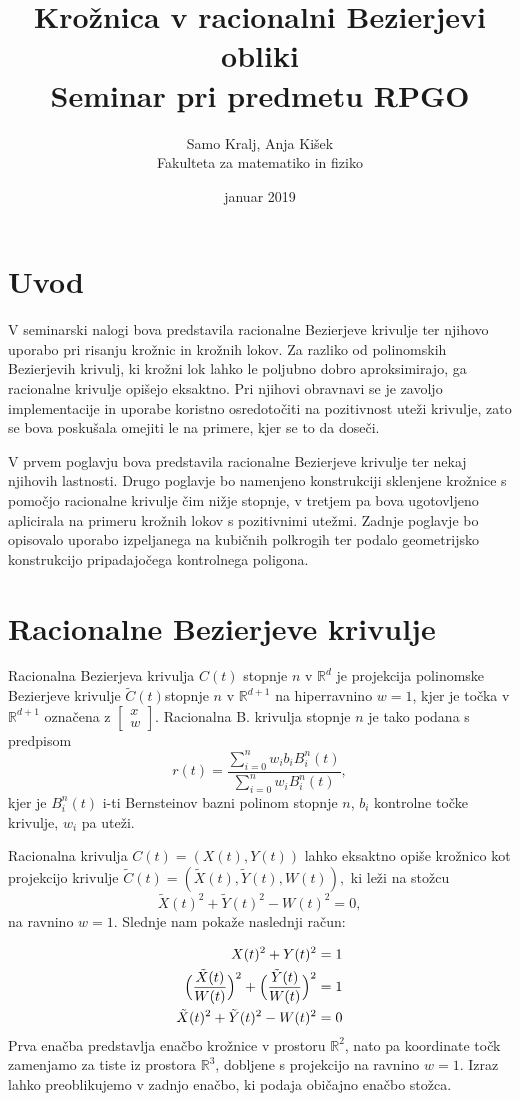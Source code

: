 \documentclass[a4paper,12pt]{article}
\title{Krožnica v racionalni Bezierjevi obliki \\ 
\Large Seminar pri predmetu RPGO}
\author{Samo Kralj, Anja Kišek \\
Fakulteta za matematiko in fiziko}
\date{januar 2019}
\begin{document}
\maketitle
\section{Uvod}
V seminarski nalogi bova predstavila racionalne Bezierjeve krivulje ter njihovo uporabo pri risanju krožnic in krožnih lokov. Za razliko od polinomskih Bezierjevih krivulj, ki krožni lok lahko le poljubno dobro aproksimirajo, ga racionalne krivulje opišejo eksaktno. Pri njihovi obravnavi se je zavoljo implementacije in uporabe koristno osredotočiti na pozitivnost uteži krivulje, zato se bova poskušala omejiti le na primere, kjer se to da doseči.

V prvem poglavju bova predstavila racionalne Bezierjeve krivulje ter nekaj njihovih lastnosti. Drugo poglavje bo namenjeno konstrukciji sklenjene krožnice s pomočjo racionalne krivulje čim nižje stopnje, v tretjem pa bova ugotovljeno aplicirala na primeru krožnih lokov s pozitivnimi utežmi. Zadnje poglavje bo opisovalo uporabo izpeljanega na kubičnih polkrogih ter podalo geometrijsko konstrukcijo pripadajočega kontrolnega poligona.

\section{Racionalne Bezierjeve krivulje}
Racionalna Bezierjeva krivulja $C(t)$ stopnje $n$ v $\mathbb{R}^d$ je projekcija polinomske Bezierjeve krivulje $\tilde{C}(t)$stopnje $n$ v $\mathbb{R}^{d+1}$ na hiperravnino $w=1$, kjer je točka v $\mathbb{R}^{d+1}$ označena z $
\begin{bmatrix} x \\ w \end{bmatrix}.$ Racionalna B. krivulja stopnje $n$ je tako podana s predpisom
$$r(t) = \frac{\sum_{i=0}^n w_ib_iB_i^n(t)}{\sum_{i=0}^n w_iB_i^n(t)}, $$
kjer je $B_i^n(t)$ i-ti Bernsteinov bazni polinom stopnje $n$, $b_i$ kontrolne točke krivulje, $w_i$ pa uteži.

Racionalna krivulja $C(t) = (X(t), Y(t))$ lahko eksaktno opiše krožnico kot projekcijo krivulje
$\tilde{C}(t) = (\tilde{X}(t), \tilde{Y}(t), W(t)),$ ki leži na stožcu $$\tilde{X}(t)^2 + \tilde{Y}(t)^2 - W(t)^2 = 0,$$ na ravnino $w = 1$. Slednje nam pokaže naslednji račun:

\begin{align*}
X(t)^2 + Y(t)^2 &= 1 \\
\Big{(}\frac{\tilde{X}(t)}{W(t)}\Big{)}^2 + \Big{(}\frac{\tilde{Y}(t)}{W(t)}\Big{)}^2 &= 1\\
\tilde{X}(t)^2 + \tilde{Y}(t)^2 - W(t)^2 &= 0
\end{align*}
Prva enačba predstavlja enačbo krožnice v prostoru $\mathbb{R}^2$, nato pa koordinate točk zamenjamo za tiste iz prostora $\mathbb{R}^3$, dobljene s projekcijo na ravnino $w=1$. Izraz lahko preoblikujemo v zadnjo enačbo, ki podaja običajno enačbo stožca.
\end{document}
